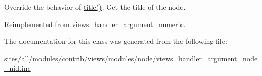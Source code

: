 Override the behavior of \hyperlink{classviews__handler__argument__numeric_480758dbcde899b5483b091e51e2bf39}{title()}. Get the title of the node. 

Reimplemented from \hyperlink{classviews__handler__argument__numeric_5c6f566b06bad6057e92f15d82311c7b}{views\_\-handler\_\-argument\_\-numeric}.

The documentation for this class was generated from the following file:\begin{CompactItemize}
\item 
sites/all/modules/contrib/views/modules/node/\hyperlink{views__handler__argument__node__nid_8inc}{views\_\-handler\_\-argument\_\-node\_\-nid.inc}\end{CompactItemize}
